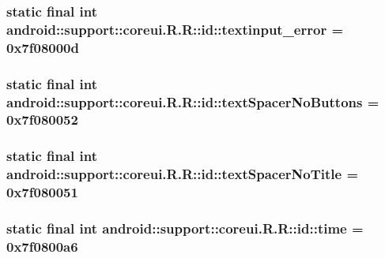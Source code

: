 \hypertarget{classandroid_1_1support_1_1coreui_1_1_r_1_1id_84d9666e65a8af524fcff66a4e2de3a9}{
\subsubsection[{textinput\_\-error}]{\setlength{\rightskip}{0pt plus 5cm}static final int android::support::coreui.R.R::id::textinput\_\-error = 0x7f08000d}}
\label{classandroid_1_1support_1_1coreui_1_1_r_1_1id_84d9666e65a8af524fcff66a4e2de3a9}


\hypertarget{classandroid_1_1support_1_1coreui_1_1_r_1_1id_be20502d7be0e8a6ca4816131296094f}{
\subsubsection[{textSpacerNoButtons}]{\setlength{\rightskip}{0pt plus 5cm}static final int android::support::coreui.R.R::id::textSpacerNoButtons = 0x7f080052}}
\label{classandroid_1_1support_1_1coreui_1_1_r_1_1id_be20502d7be0e8a6ca4816131296094f}


\hypertarget{classandroid_1_1support_1_1coreui_1_1_r_1_1id_bed3d71ae3ee608c37758b64f28dde5d}{
\subsubsection[{textSpacerNoTitle}]{\setlength{\rightskip}{0pt plus 5cm}static final int android::support::coreui.R.R::id::textSpacerNoTitle = 0x7f080051}}
\label{classandroid_1_1support_1_1coreui_1_1_r_1_1id_bed3d71ae3ee608c37758b64f28dde5d}


\hypertarget{classandroid_1_1support_1_1coreui_1_1_r_1_1id_54165b0bafe8bcd05c644be984f1b7a2}{
\subsubsection[{time}]{\setlength{\rightskip}{0pt plus 5cm}static final int android::support::coreui.R.R::id::time = 0x7f0800a6}}
\label{classandroid_1_1support_1_1coreui_1_1_r_1_1id_54165b0bafe8bcd05c644be984f1b7a2}


